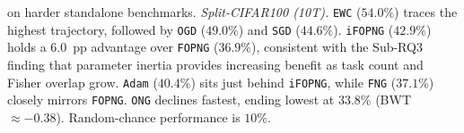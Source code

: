 on harder standalone benchmarks.
%
\emph{Split-CIFAR100 (10T).}
\texttt{EWC} ($54.0\%$) traces the highest trajectory, followed by \texttt{OGD}
($49.0\%$) and \texttt{SGD} ($44.6\%$). \texttt{iFOPNG} ($42.9\%$) holds a
$6.0$~pp advantage over \texttt{FOPNG} ($36.9\%$), consistent with the Sub-RQ3
finding that parameter inertia provides increasing benefit as task count and
Fisher overlap grow. \texttt{Adam} ($40.4\%$) sits just behind \texttt{iFOPNG},
while \texttt{FNG} ($37.1\%$) closely mirrors \texttt{FOPNG}. \texttt{ONG}
declines fastest, ending lowest at $33.8\%$ (BWT~$\approx-0.38$). Random-chance
performance is $10\%$.
